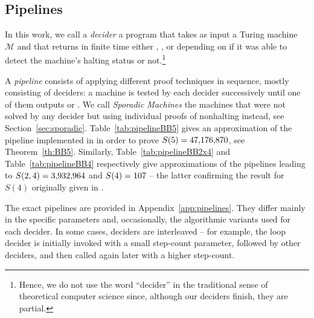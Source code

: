 
\subsection{Pipelines}\label{sec:pipelines}

In this work, we call a \textit{decider} a program that takes as input a Turing machine $\mathcal{M}$ and that returns in finite time either \HALT, \NONHALT, or \UNKNOWN depending on if it was able to detect the machine's halting status or not.\footnote{Hence, we do not use the word ``decider'' in the traditional sense of theoretical computer science since, although our deciders finish, they are partial.}

A \textit{pipeline} consists of applying different proof techniques in sequence, mostly consisting of deciders: a machine is tested by each decider successively until one of them outputs \HALT or \NONHALT. We call \textit{Sporadic Machines} the \numSporadic machines that were not solved by any decider but using individual proofs of nonhalting instead, see Section~\ref{sec:sporadic}. Table~\ref{tab:pipelineBB5} gives an approximation of the pipeline implemented in \CoqBB in order to prove $S(5) = 47{,}176{,}870$, see Theorem~\ref{th:BB5}. Similarly, Table~\ref{tab:pipelineBB2x4} and Table~\ref{tab:pipelineBB4} respectively give approximations of the pipelines leading to $S(2,4) = 3{,}932{,}964$ and $S(4) = 107$ -- the latter confirming the result for $S(4)$ originally given in \cite{Brady83}.

The exact pipelines are provided in Appendix~\ref{app:pipelines}. They differ mainly in the specific parameters and, occasionally, the algorithmic variants used for each decider. In some cases, deciders are interleaved -- for example, the loop decider is initially invoked with a small step-count parameter, followed by other deciders, and then called again later with a higher step-count. %


